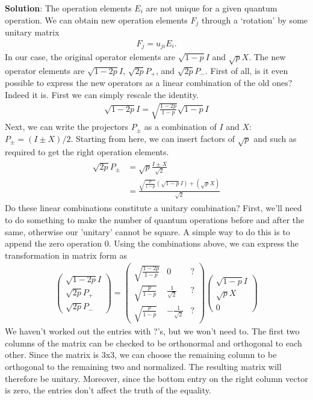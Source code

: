 \documentclass{book}
\begin{document}
    \textbf{Solution}: The operation elements $E_i$ are not unique for a given quantum operation. We can obtain new operation elements $F_j$ through a `rotation' by some unitary matrix
    \begin{align}
        F_j = u_{ji} E_i.
    \end{align}
    In our case, the original operator elements are $\sqrt{1-p}I$ and $\sqrt{p}X$. The new operator elements are $\sqrt{1-2p}I$, $\sqrt{2p}P_+$, and $\sqrt{2p}P_-$. First of all, is it even possible to express the new operators as a linear combination of the old ones? Indeed it is. First we can simply rescale the identity.
    \begin{align}
        \sqrt{1-2p}I = \sqrt{\frac{1-2p}{1-p}} \sqrt{1-p}I
    \end{align}
    Next, we can write the projectors $P_\pm$ as a combination of $I$ and $X$: $P_\pm = (I\pm X)/2$. Starting from here, we can insert factors of $\sqrt{p}$ and such as required to get the right operation elements.
    \begin{align}
    \begin{aligned}
        \sqrt{2p}P_\pm &= \sqrt{p} \frac{I\pm X}{\sqrt{2}} \\
        &= \frac{\sqrt{\frac{p}{1-p}} \left(\sqrt{1-p}I\right) + \left(\sqrt{p} X\right)}{\sqrt{2}}
    \end{aligned}
    \end{align}
    Do these linear combinations constitute a unitary combination? First, we'll need to do something to make the number of quantum operations before and after the same, otherwise our 'unitary' cannot be square. A simple way to do this is to append the zero operation 0. Using the combinations above, we can express the transformation in matrix form as
    \begin{align}
        \begin{pmatrix}
            \sqrt{1-2p} I \\
            \sqrt{2p}P_+ \\
            \sqrt{2p}P_- 
        \end{pmatrix}
        =
        \begin{pmatrix}
            \sqrt{\frac{1-2p}{1-p}} & 0 & ? \\
            \sqrt{\frac{p}{1-p}} & \frac{1}{\sqrt{2}} & ? \\
            \sqrt{\frac{p}{1-p}} & -\frac{1}{\sqrt{2}} & ?
        \end{pmatrix}
        \begin{pmatrix}
            \sqrt{1-p}I \\
            \sqrt{p} X \\
            0
        \end{pmatrix}
    \end{align}
    We haven't worked out the entries with ?'s, but we won't need to. The first two columns of the matrix can be checked to be orthonormal and orthogonal to each other. Since the matrix is 3x3, we can choose the remaining column to be orthogonal to the remaining two and normalized. The resulting matrix will therefore be unitary. Moreover, since the bottom entry on the right column vector is zero, the entries don't affect the truth of the equality. 
    
\end{document}
